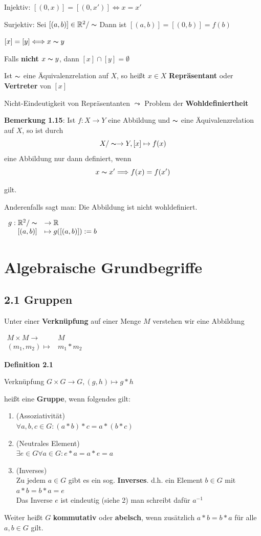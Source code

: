 \documentclass{scrartcl}
\begin{document}
Injektiv: $[(0,x)]=[(0,x')] \Longleftrightarrow x=x'$
 
Surjektiv: Sei $[(a,b)]\in \mathbb{R}^2/\thicksim$ Dann ist $[(a,b)] = [(0,b)]=f(b)$

$[x]=[y] \Longleftrightarrow x \thicksim y$

Falls \textbf{nicht} $x \thicksim y$, dann $[x] \cap [y]=\emptyset$

Ist $\thicksim$ eine Äquivalenzrelation auf $X$, so heißt $x \in X$ \textbf{Repräsentant} oder \textbf{Vertreter} von $[x]$

Nicht-Eindeutigkeit von Repräsentanten $\leadsto$ Problem der \textbf{Wohldefiniertheit}

\textbf{Bemerkung 1.15}: Ist $f:X \to Y$ eine Abbildung und $\thicksim$ eine Äquivalenzrelation auf $X$, so ist durch 
\[X/\thicksim \to Y, [x] \mapsto f(x)\]
eine Abbildung nur dann definiert, wenn 
\[x\thicksim x' \Longrightarrow f(x)=f(x')\]

gilt.

Anderenfalls sagt man: Die Abbildung ist nicht wohldefiniert. 

$\begin{array}{rl}
    g: \mathbb{R}^2/\thicksim & \to     \mathbb{R} \\
           \left[(a,b)\right] & \mapsto g([(a,b)]):=b
\end{array}$

\section{Algebraische Grundbegriffe}

\subsection{2.1 Gruppen}

Unter einer \textbf{Verknüpfung} auf einer Menge $M$ verstehen wir eine Abbildung 

$\begin{array}{rl}
    M \times M \to & M \\
    (m_1,m_2) \mapsto & m_1*m_2
\end{array}$

\textbf{Definition 2.1}

Verknüpfung $G \times G \to G, (g,h) \mapsto g*h$

heißt eine \textbf{Gruppe}, wenn folgendes gilt:

\begin{enumerate}
 \item (Assoziativität) \\
 	$\forall a,b,c \in G: (a*b)*c=a*(b*c)$
 \item (Neutrales Element) \\
    $\exists e \in G \forall a \in G: e*a=a*e=a$
 \item (Inverses) \\
    Zu jedem $a\in G$ gibt es ein sog. \textbf{Inverses}. d.h. ein Element $b \in G$ mit $a*b=b*a=e$ \\
    Das Inverse $e$  ist eindeutig (siehe 2) man schreibt dafür $a^{-1}$
\end{enumerate}

Weiter heißt $G$ \textbf{kommutativ} oder \textbf{abelsch}, wenn zusätzlich $a*b=b*a$ für alle $a,b \in G$ gilt.
\end{document}
